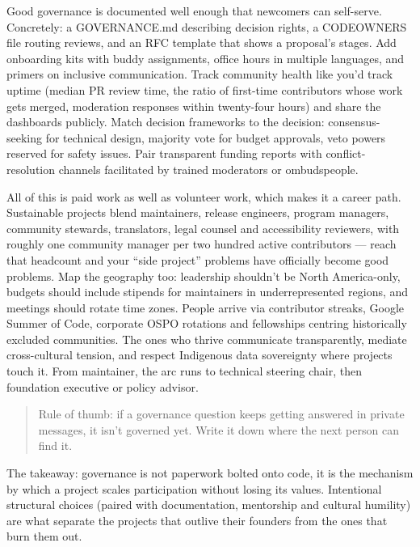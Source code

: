 Good governance is documented well enough that newcomers can self-serve. Concretely: a GOVERNANCE.md describing decision rights, a CODEOWNERS file routing reviews, and an RFC template that shows a proposal's stages. Add onboarding kits with buddy assignments, office hours in multiple languages, and primers on inclusive communication. Track community health like you'd track uptime (median PR review time, the ratio of first-time contributors whose work gets merged, moderation responses within twenty-four hours) and share the dashboards publicly. Match decision frameworks to the decision: consensus-seeking for technical design, majority vote for budget approvals, veto powers reserved for safety issues. Pair transparent funding reports with conflict-resolution channels facilitated by trained moderators or ombudspeople.


All of this is paid work as well as volunteer work, which makes it a career path. Sustainable projects blend maintainers, release engineers, program managers, community stewards, translators, legal counsel and accessibility reviewers, with roughly one community manager per two hundred active contributors — reach that headcount and your ``side project'' problems have officially become good problems. Map the geography too: leadership shouldn't be North America-only, budgets should include stipends for maintainers in underrepresented regions, and meetings should rotate time zones. People arrive via contributor streaks, Google Summer of Code, corporate OSPO rotations and fellowships centring historically excluded communities. The ones who thrive communicate transparently, mediate cross-cultural tension, and respect Indigenous data sovereignty where projects touch it. From maintainer, the arc runs to technical steering chair, then foundation executive or policy advisor.



\begin{quote}\small
Rule of thumb: if a governance question keeps getting answered in private messages, it isn't governed yet. Write it down where the next person can find it.
\end{quote}


The takeaway: governance is not paperwork bolted onto code, it is the mechanism by which a project scales participation without losing its values. Intentional structural choices (paired with documentation, mentorship and cultural humility) are what separate the projects that outlive their founders from the ones that burn them out.

